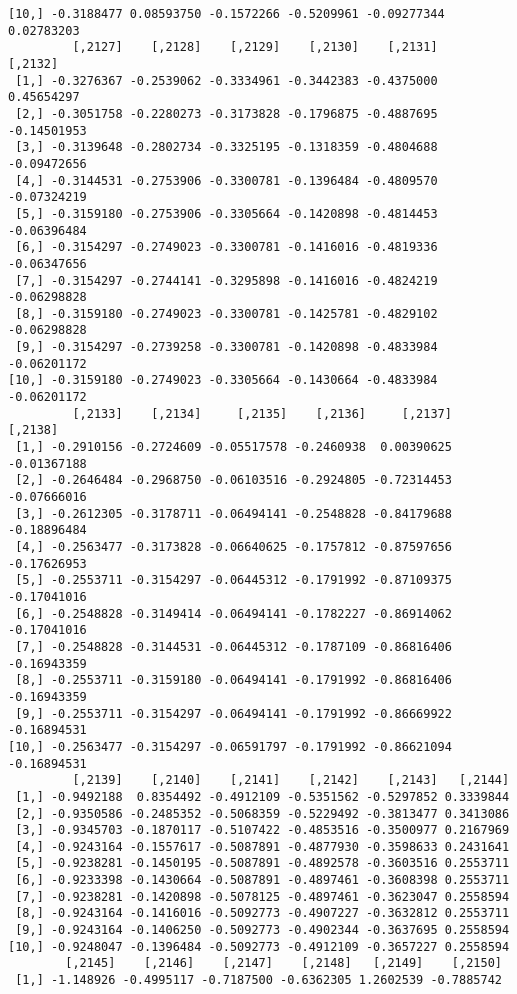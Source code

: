 \documentclass[
  letterpaper,
  DIV=11,
  numbers=noendperiod]{scrreprt}
\begin{document}
\begin{verbatim}
[10,] -0.3188477 0.08593750 -0.1572266 -0.5209961 -0.09277344 0.02783203
         [,2127]    [,2128]    [,2129]    [,2130]    [,2131]     [,2132]
 [1,] -0.3276367 -0.2539062 -0.3334961 -0.3442383 -0.4375000  0.45654297
 [2,] -0.3051758 -0.2280273 -0.3173828 -0.1796875 -0.4887695 -0.14501953
 [3,] -0.3139648 -0.2802734 -0.3325195 -0.1318359 -0.4804688 -0.09472656
 [4,] -0.3144531 -0.2753906 -0.3300781 -0.1396484 -0.4809570 -0.07324219
 [5,] -0.3159180 -0.2753906 -0.3305664 -0.1420898 -0.4814453 -0.06396484
 [6,] -0.3154297 -0.2749023 -0.3300781 -0.1416016 -0.4819336 -0.06347656
 [7,] -0.3154297 -0.2744141 -0.3295898 -0.1416016 -0.4824219 -0.06298828
 [8,] -0.3159180 -0.2749023 -0.3300781 -0.1425781 -0.4829102 -0.06298828
 [9,] -0.3154297 -0.2739258 -0.3300781 -0.1420898 -0.4833984 -0.06201172
[10,] -0.3159180 -0.2749023 -0.3305664 -0.1430664 -0.4833984 -0.06201172
         [,2133]    [,2134]     [,2135]    [,2136]     [,2137]     [,2138]
 [1,] -0.2910156 -0.2724609 -0.05517578 -0.2460938  0.00390625 -0.01367188
 [2,] -0.2646484 -0.2968750 -0.06103516 -0.2924805 -0.72314453 -0.07666016
 [3,] -0.2612305 -0.3178711 -0.06494141 -0.2548828 -0.84179688 -0.18896484
 [4,] -0.2563477 -0.3173828 -0.06640625 -0.1757812 -0.87597656 -0.17626953
 [5,] -0.2553711 -0.3154297 -0.06445312 -0.1791992 -0.87109375 -0.17041016
 [6,] -0.2548828 -0.3149414 -0.06494141 -0.1782227 -0.86914062 -0.17041016
 [7,] -0.2548828 -0.3144531 -0.06445312 -0.1787109 -0.86816406 -0.16943359
 [8,] -0.2553711 -0.3159180 -0.06494141 -0.1791992 -0.86816406 -0.16943359
 [9,] -0.2553711 -0.3154297 -0.06494141 -0.1791992 -0.86669922 -0.16894531
[10,] -0.2563477 -0.3154297 -0.06591797 -0.1791992 -0.86621094 -0.16894531
         [,2139]    [,2140]    [,2141]    [,2142]    [,2143]   [,2144]
 [1,] -0.9492188  0.8354492 -0.4912109 -0.5351562 -0.5297852 0.3339844
 [2,] -0.9350586 -0.2485352 -0.5068359 -0.5229492 -0.3813477 0.3413086
 [3,] -0.9345703 -0.1870117 -0.5107422 -0.4853516 -0.3500977 0.2167969
 [4,] -0.9243164 -0.1557617 -0.5087891 -0.4877930 -0.3598633 0.2431641
 [5,] -0.9238281 -0.1450195 -0.5087891 -0.4892578 -0.3603516 0.2553711
 [6,] -0.9233398 -0.1430664 -0.5087891 -0.4897461 -0.3608398 0.2553711
 [7,] -0.9238281 -0.1420898 -0.5078125 -0.4897461 -0.3623047 0.2558594
 [8,] -0.9243164 -0.1416016 -0.5092773 -0.4907227 -0.3632812 0.2553711
 [9,] -0.9243164 -0.1406250 -0.5092773 -0.4902344 -0.3637695 0.2558594
[10,] -0.9248047 -0.1396484 -0.5092773 -0.4912109 -0.3657227 0.2558594
        [,2145]    [,2146]    [,2147]    [,2148]   [,2149]    [,2150]
 [1,] -1.148926 -0.4995117 -0.7187500 -0.6362305 1.2602539 -0.7885742

\end{verbatim}
\end{document}
